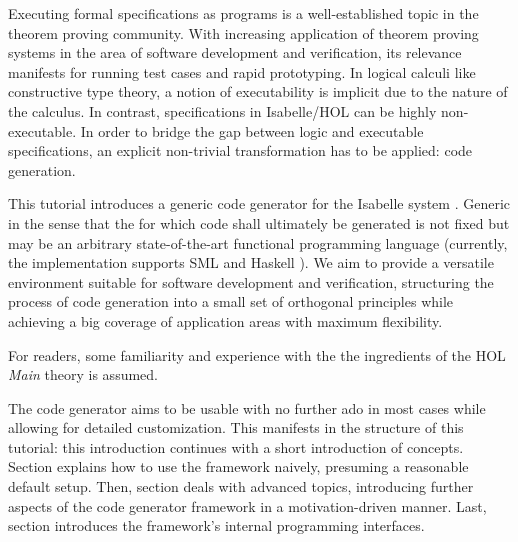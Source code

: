 %
\begin{isabellebody}%
\def\isabellecontext{Codegen}%
%
\isadelimtheory
\isanewline
\isanewline
%
\endisadelimtheory
%
\isatagtheory
%
\endisatagtheory
{\isafoldtheory}%
%
\isadelimtheory
%
\endisadelimtheory
%
\isadelimML
%
\endisadelimML
%
\isatagML
%
\endisatagML
{\isafoldML}%
%
\isadelimML
%
\endisadelimML
%
\isamarkuptrue%
%
\isamarkuptrue%
%
\isamarkuptrue%
%
\begin{isamarkuptext}%
Executing formal specifications as programs is a well-established
  topic in the theorem proving community.  With increasing
  application of theorem proving systems in the area of
  software development and verification, its relevance manifests
  for running test cases and rapid prototyping.  In logical
  calculi like constructive type theory,
  a notion of executability is implicit due to the nature
  of the calculus.  In contrast, specifications in Isabelle/HOL
  can be highly non-executable.  In order to bridge
  the gap between logic and executable specifications,
  an explicit non-trivial transformation has to be applied:
  code generation.

  This tutorial introduces a generic code generator for the
  Isabelle system \cite{isa-tutorial}.
  Generic in the sense that the
   for which code shall ultimately be
  generated is not fixed but may be an arbitrary state-of-the-art
  functional programming language (currently, the implementation
  supports SML \cite{web:sml} and Haskell \cite{web:haskell}).
  We aim to provide a
  versatile environment
  suitable for software development and verification,
  structuring the process
  of code generation into a small set of orthogonal principles
  while achieving a big coverage of application areas
  with maximum flexibility.

  For readers, some familiarity and experience
  with the the ingredients
  of the HOL \emph{Main} theory is assumed.%
\end{isamarkuptext}%
\isamarkuptrue%
%
\isamarkuptrue%
%
\begin{isamarkuptext}%
The code generator aims to be usable with no further ado
  in most cases while allowing for detailed customization.
  This manifests in the structure of this tutorial: this introduction
  continues with a short introduction of concepts.  Section
   explains how to use the framework naively,
  presuming a reasonable default setup.  Then, section
   deals with advanced topics,
  introducing further aspects of the code generator framework
  in a motivation-driven manner.  Last, section 
  introduces the framework's internal programming interfaces.


\end{isamarkuptext}
\end{isabellebody}
